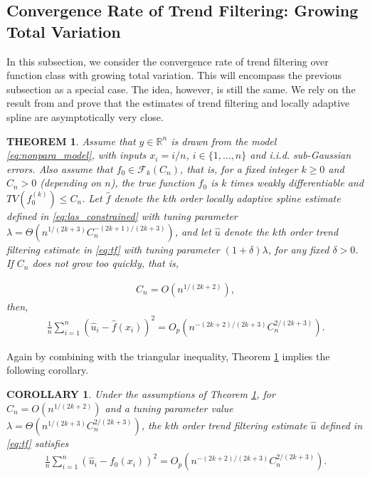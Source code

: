 \documentclass[a4paper]{article}
\newtheorem{theorem}{THEOREM}
\newtheorem{corollary}{COROLLARY}
\newcommand{\RR}{\mathbb{R}}
\renewcommand{\cal}{\mathcal}
\begin{document}
\subsection{Convergence Rate of Trend Filtering: Growing Total Variation}
In this subsection, we consider the convergence rate of trend filtering over function class with growing total variation. This will encompass the previous subsection as a special case. The idea, however, is still the same. We rely on the result from \cite{mammen1997locally} and prove that the estimates of trend filtering and locally adaptive spline are asymptotically very close.

\begin{theorem}
Assume that $y\in\RR^n$ is drawn from the model \eqref{eq:nonpara_model}, with inputs $x_i = i/n$, $i\in\{1,\ldots, n\}$ and i.i.d. sub-Gaussian errors. Also assume that $f_0\in\cal{F}_k(C_n)$, that is, for a fixed integer $k\geq 0$ and $C_n > 0$ (depending on $n$), the true function $f_0$ is $k$ times weakly differentiable and $TV(f^{(k)}_0)\leq C_n$. Let $\hat{f}$ denote the $k$th order locally adaptive spline estimate defined in \eqref{eq:las_constrained} with tuning parameter $\lambda = \Theta(n^{1/(2k+3)}C_n^{-(2k+1)/(2k+3)})$, and let $\hat{u}$ denote the $k$th order trend filtering estimate in \eqref{eq:tf} with tuning parameter $(1+\delta)\lambda$, for any fixed $\delta >0$. If $C_n$ does not grow too quickly, that is,

\begin{align}
C_n = O(n^{1/(2k+2)}),
\label{eq:tv_rate}
\end{align}
then,
\begin{align*}
\frac{1}{n}\sum_{i=1}^n(\hat{u}_i - \hat{f}(x_i))^2 = O_p(n^{-(2k+2)/(2k+3)}C_n^{2/(2k+3)}).
\end{align*}
\label{thm:2}
\end{theorem}

Again by combining with the triangular inequality, Theorem \ref{thm:2} implies the following corollary.

\begin{corollary}
Under the assumptions of Theorem \ref{thm:2}, for $C_n = O(n^{1/(2k+2)})$ and a tuning parameter value $\lambda = \Theta(n^{1/(2k+3)}C_n^{2/(2k+3)})$, the $k$th order trend filtering estimate $\hat{u}$ defined in \eqref{eq:tf} satisfies
\begin{align*}
\frac{1}{n}\sum_{i=1}^n(\hat{u}_i - f_0(x_i))^2 = O_p(n^{-(2k+2)/(2k+3)}C_n^{2/(2k+3)}).
\end{align*}
\label{cor:2}
\end{corollary}
\end{document}

